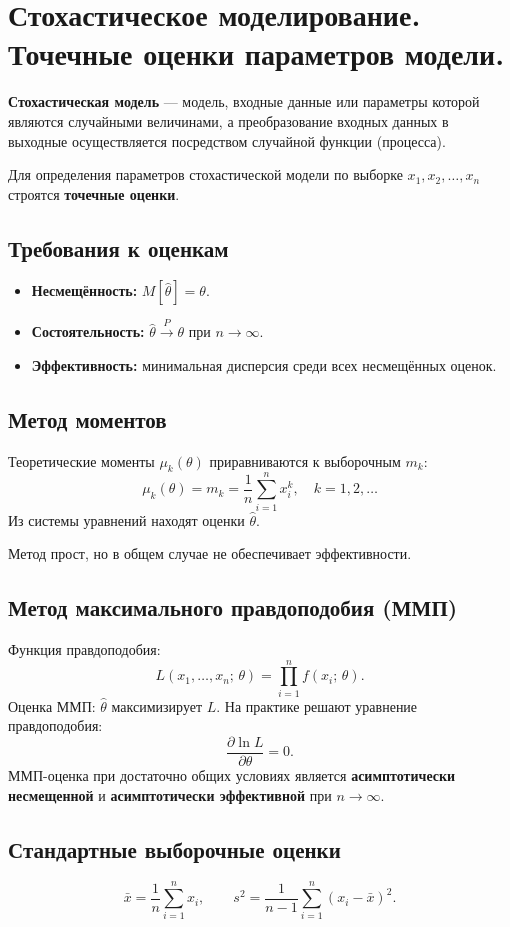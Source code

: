 \section{Стохастическое моделирование. Точечные оценки параметров модели.}

\textbf{Стохастическая модель} — модель, входные данные или параметры которой являются случайными величинами, а преобразование входных данных в выходные осуществляется посредством случайной функции (процесса).

Для определения параметров стохастической модели по выборке $x_1, x_2, \ldots, x_n$ строятся \textbf{точечные оценки}.

\subsection*{Требования к оценкам}

\begin{itemize}
  \item \textbf{Несмещённость:} $M[\hat{\theta}] = \theta$.
  \item \textbf{Состоятельность:} $\hat{\theta} \xrightarrow{P} \theta$ при $n \to \infty$.
  \item \textbf{Эффективность:} минимальная дисперсия среди всех несмещённых оценок.
\end{itemize}

\subsection*{Метод моментов}

Теоретические моменты $\mu_k(\theta)$ приравниваются к выборочным $m_k$:
\[
  \mu_k(\theta) = m_k = \frac{1}{n}\sum_{i=1}^n x_i^k, \quad k = 1, 2, \ldots
\]
Из системы уравнений находят оценки $\hat{\theta}$.

Метод прост, но в общем случае не обеспечивает эффективности.

\subsection*{Метод максимального правдоподобия (ММП)}

Функция правдоподобия:
\[
  L(x_1,\ldots,x_n;\,\theta) = \prod_{i=1}^n f(x_i;\,\theta).
\]
Оценка ММП: $\hat{\theta}$ максимизирует $L$. На практике решают уравнение правдоподобия:
\[
  \frac{\partial \ln L}{\partial \theta} = 0.
\]
ММП-оценка при достаточно общих условиях является \textbf{асимптотически несмещенной} и \textbf{асимптотически эффективной} при $n \to \infty$.

\subsection*{Стандартные выборочные оценки}

\[
  \bar{x} = \frac{1}{n}\sum_{i=1}^n x_i, \qquad
  s^2 = \frac{1}{n-1}\sum_{i=1}^n (x_i - \bar{x})^2.
\]

\clearpage
